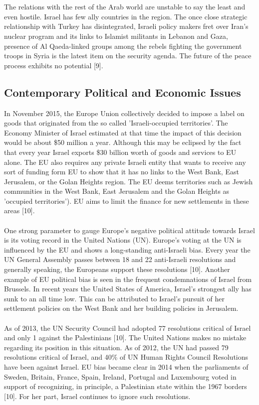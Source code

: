 \documentclass[10pt]{article}
\begin{document}
\\
\\
The relations with the rest of the Arab world are unstable to say the least and even hostile. Israel has few ally countries in the region. The once close strategic relationship with Turkey has disintegrated, Israeli policy makers fret over Iran’s nuclear program and its links to Islamist militants in Lebanon and Gaza, presence of Al Qaeda-linked groups among the rebels fighting the government troops in Syria is the latest item on the security agenda. The future of the peace process exhibits no potential [9].

\subsection{Contemporary Political and Economic Issues}
In November 2015, the Europe Union collectively decided to impose a label on goods that originated from the so called 'Israeli-occupied territories'. The Economy Minister of Israel estimated at that time the impact of this decision would be about \$50 million a year. Although this may be eclipsed by the fact that every year Israel exports \$30 billion worth of goods and services to EU alone. The EU also requires any private Israeli entity that wants to receive any sort of funding form EU to show that it has no links to the West Bank, East Jerusalem, or the Golan Heights region. The EU deems territories such as Jewish communities in the West Bank, East Jerusalem and the Golan Heights as 'occupied territories'). EU aims to limit the finance for new settlements in these areas [10].
\\
\\
One strong parameter to gauge Europe's negative political attitude towards Israel is its voting record in the United Nations (UN). Europe's voting at the UN is influenced by the EU and shows a long-standing anti-Israeli bias. Every year the UN General Assembly passes between 18 and 22 anti-Israeli resolutions and generally speaking, the Europeans support these resolutions [10]. Another example of EU political bias is seen in the frequent condemnations of Israel from Brussels. In recent years the United States of America, Israel's strongest ally has sunk to an all time low. This can be attributed to Israel’s pursuit of her settlement policies on the West Bank and her building policies in Jerusalem.
\\
\\
As of 2013, the UN Security Council had adopted 77 resolutions critical of Israel and only 1 against the Palestinians [10]. The United Nations makes no mistake regarding its position in this situation. As of 2012, the UN had passed 79 resolutions critical of Israel, and 40\% of UN Human Rights Council Resolutions have been against Israel. EU bias became clear in 2014 when the parliaments of Sweden, Britain, France, Spain, Ireland, Portugal and Luxembourg voted in support of recognizing, in principle, a Palestinian state within the 1967 borders [10]. For her part, Israel continues to ignore such resolutions.
\end{document}
